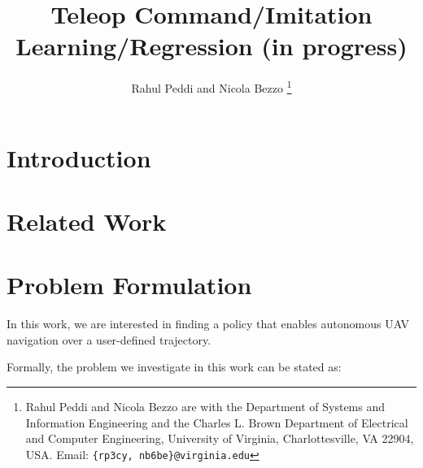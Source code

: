 \documentclass[letterpaper, 10 pt, conference]{ieeeconf}  %
\begin{document}
\title{\LARGE \bf
Teleop Command/Imitation Learning/Regression (in progress)
}


\author{Rahul Peddi and Nicola Bezzo%
\thanks{Rahul Peddi and Nicola Bezzo are with the Department of Systems and Information Engineering and the Charles L. Brown Department of Electrical and Computer Engineering, University of Virginia, Charlottesville, VA 22904, USA. Email: {\tt \{rp3cy, nb6be\}@virginia.edu}}}



\maketitle
\thispagestyle{empty}
\pagestyle{empty}


\begin{abstract}


\end{abstract}


\section{Introduction}

\section{Related Work}


\section{Problem Formulation}
In this work, we are interested in finding a policy that enables autonomous UAV navigation over a user-defined trajectory.

Formally, the problem we investigate in this work can be stated as:
\end{document}
